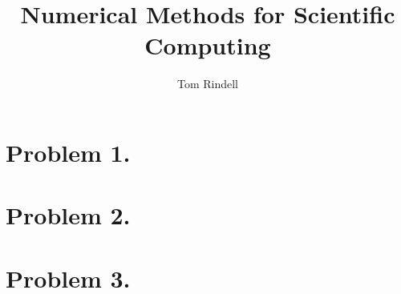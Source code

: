 \documentclass[12pt, letterpaper]{article}
\author{Tom Rindell}
\title{Numerical Methods for Scientific Computing}
\begin{document}
\section{Problem 1.}

\section{Problem 2.}

\section{Problem 3.}
\end{document}

